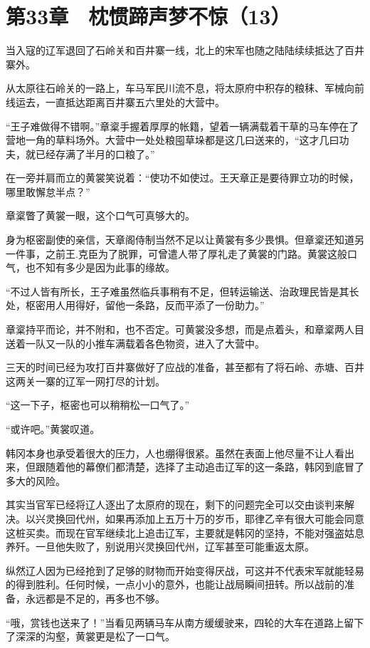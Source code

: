 \section{第33章　枕惯蹄声梦不惊（13）}

当入寇的辽军退回了石岭关和百井寨一线，北上的宋军也随之陆陆续续抵达了百井寨外。

从太原往石岭关的一路上，车马军民川流不息，将太原府中积存的粮秣、军械向前线运去，一直抵达距离百井寨五六里处的大营中。

“王子难做得不错啊。”章楶手握着厚厚的帐籍，望着一辆满载着干草的马车停在了营地一角的草料场外。大营中一处处粮囤草垛都是这几曰送来的，“这才几曰功夫，就已经存满了半月的口粮了。”

在一旁并肩而立的黄裳笑说着：“使功不如使过。王天章正是要待罪立功的时候，哪里敢懈怠半点？”

章楶瞥了黄裳一眼，这个口气可真够大的。

身为枢密副使的亲信，天章阁侍制当然不足以让黄裳有多少畏惧。但章楶还知道另一件事，之前王.克臣为了脱罪，可曾遣人带了厚礼走了黄裳的门路。黄裳这般口气，也不知有多少是因为此事的缘故。

“不过人皆有所长，王子难虽然临兵事稍有不足，但转运输送、治政理民皆是其长处，枢密用人用得好，留他一条路，反而平添了一份助力。”

章楶持平而论，并不附和，也不否定。可黄裳没多想，而是点着头，和章楶两人目送着一队又一队的小推车满载着各色物资，进入了大营中。

三天的时间已经为攻打百井寨做好了应战的准备，甚至都有了将石岭、赤塘、百井这两关一寨的辽军一网打尽的计划。

“这一下子，枢密也可以稍稍松一口气了。”

“或许吧。”黄裳叹道。

韩冈本身也承受着很大的压力，人也绷得很紧。虽然在表面上他尽量不让人看出来，但跟随着他的幕僚们都清楚，选择了主动追击辽军的这一条路，韩冈到底冒了多大的风险。

其实当官军已经将辽人逐出了太原府的现在，剩下的问题完全可以交由谈判来解决。以兴灵换回代州，如果再添加上五万十万的岁币，耶律乙辛有很大可能会同意这桩买卖。而现在官军继续北上追击辽军，主要就是韩冈的坚持，不能对强盗姑息养歼。一旦他失败了，别说用兴灵换回代州，辽军甚至可能重返太原。

纵然辽人因为已经抢到了足够的财物而开始变得厌战，可这并不代表宋军就能轻易的得到胜利。任何时候，一点小小的意外，也能让战局瞬间扭转。所以战前的准备，永远都是不足的，再多也不够。

“哦，赏钱也送来了！”当看见两辆马车从南方缓缓驶来，四轮的大车在道路上留下了深深的沟壑，黄裳更是松了一口气。

